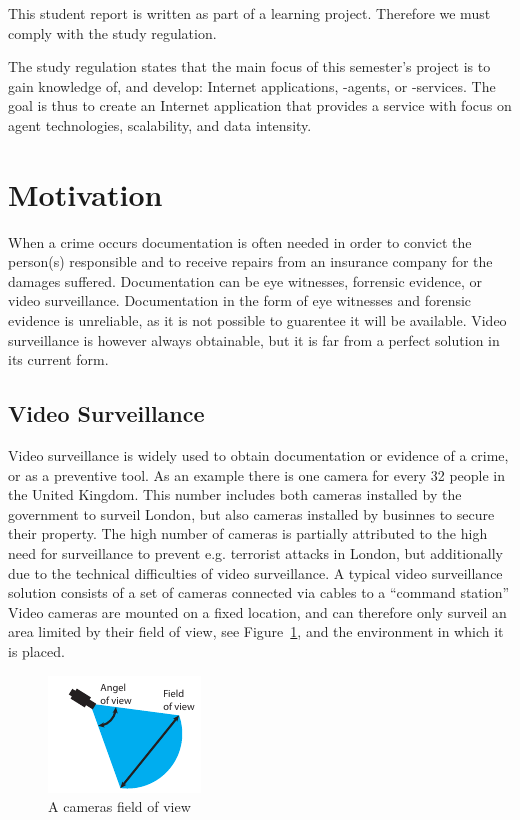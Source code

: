This student report is written as part of a learning project. Therefore we must comply with the study regulation.

The study regulation states that the main focus of this semester's project is to gain knowledge of, and develop: Internet applications, -agents, or -services.
The goal is thus to create an Internet application that provides a service with focus on agent technologies, scalability, and data intensity.

\section{Motivation}
When a crime occurs documentation is often needed in order to convict the person(s) responsible and to receive repairs from an insurance company for the damages suffered.
Documentation can be eye witnesses, forrensic evidence, or video surveillance.
Documentation in the form of eye witnesses and forensic evidence is unreliable, as it is not possible to guarentee it will be available.
Video surveillance is however always obtainable, but it is far from a perfect solution in its current form.

\subsection{Video Surveillance}
Video surveillance is widely used to obtain documentation or evidence of a crime, or as a preventive tool.
As an example there is one camera for every 32 people in the United Kingdom\citep{london_camera_surveillance}.
This number includes both cameras installed by the government to surveil London, but also cameras installed by businnes to secure their property.
The high number of cameras is partially attributed to the high need for surveillance to prevent e.g. terrorist attacks in London, but additionally due to the technical difficulties of video surveillance.
A typical video surveillance solution consists of a set of cameras connected via cables to a ``command station''
Video cameras are mounted on a fixed location, and can therefore only surveil an area limited by their field of view, see Figure~\ref{fig:camera_properties}, and the environment in which it is placed.

\begin{figure}[htb]
    \centering
    \includegraphics[scale=1.8]{gfx/camera_properties.pdf}
    \caption{A cameras field of view}
    \label{fig:camera_properties}
\end{figure}

